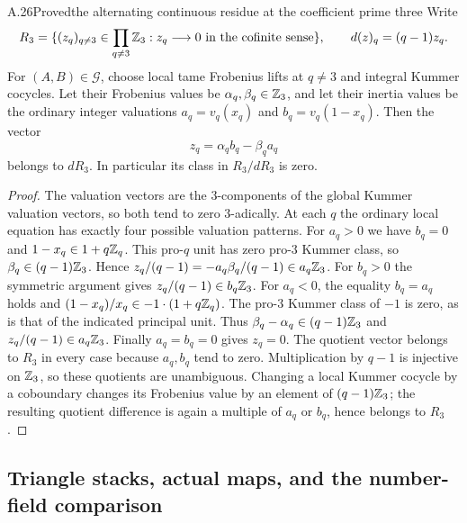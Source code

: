 \begin{statement}{A.26}{Proved}{the alternating continuous residue at the coefficient prime three}
Write
\[
R_3=\{(z_q)_{q\ne3}\in\prod_{q\ne3}\mathbb Z_3:
 z_q\longrightarrow0\text{ in the cofinite sense}\},
\qquad d(z)_q=(q-1)z_q.
\]
For $(A,B)\in\mathcal G$, choose local tame Frobenius lifts at $q\ne3$
and integral Kummer cocycles. Let their Frobenius values be
$\alpha_q,\beta_q\in\mathbb Z_3$, and let their inertia values be the ordinary
integer valuations $a_q=v_q(x_q)$ and $b_q=v_q(1-x_q)$.
Then the vector
\[
 z_q=\alpha_q b_q-\beta_q a_q
\]
belongs to $dR_3$. In particular its class in $R_3/dR_3$ is zero.
\end{statement}
\begin{proof}
The valuation vectors are the $3$-components of the global Kummer
valuation vectors, so both tend to zero $3$-adically. At each $q$ the
ordinary local equation has exactly four possible valuation patterns.
For $a_q>0$ we have $b_q=0$ and $1-x_q\in1+q\mathbb Z_q$.
This pro-$q$ unit has zero pro-$3$ Kummer class, so
$\beta_q\in(q-1)\mathbb Z_3$. Hence
$z_q/(q-1)=-a_q\beta_q/(q-1)\in a_q\mathbb Z_3$.
For $b_q>0$ the symmetric argument gives
$z_q/(q-1)\in b_q\mathbb Z_3$.
For $a_q<0$, the equality $b_q=a_q$ holds and
$(1-x_q)/x_q\in-1\cdot(1+q\mathbb Z_q)$.
The pro-$3$ Kummer class of $-1$ is zero, as is that of the indicated
principal unit. Thus
$\beta_q-\alpha_q\in(q-1)\mathbb Z_3$ and
$z_q/(q-1)\in a_q\mathbb Z_3$.
Finally $a_q=b_q=0$ gives $z_q=0$.
The quotient vector belongs to $R_3$ in every case because $a_q,b_q$
tend to zero. Multiplication by $q-1$ is injective on $\mathbb Z_3$, so these
quotients are unambiguous. Changing a local Kummer cocycle by a
coboundary changes its Frobenius value by an element of
$(q-1)\mathbb Z_3$; the resulting quotient difference is again a multiple of
$a_q$ or $b_q$, hence belongs to $R_3$.
\end{proof}



\subsection{Triangle stacks, actual maps, and the number-field comparison}

